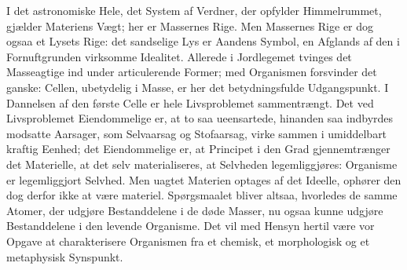 \documentclass[12pt,a4paper]{book}
\begin{document}
I det astronomiske Hele, det System af Verdner, der opfylder
Himmelrummet, gjælder Materiens Vægt; her er
Massernes Rige. Men Massernes Rige er dog ogsaa et Lysets Rige: det
sandselige Lys er Aandens Symbol, en Afglands af den i
Fornuftgrunden virksomme Idealitet. Allerede i Jordlegemet tvinges
det Masseagtige ind under articulerende Former; med Organismen
forsvinder det ganske: Cellen, ubetydelig i Masse, er her det
betydningsfulde Udgangspunkt. I Dannelsen af den første Celle er
hele Livsproblemet sammentrængt. Det ved Livsproblemet
Eiendommelige er, at to saa ueensartede, hinanden saa indbyrdes
modsatte Aarsager, som Selvaarsag og Stofaarsag, virke sammen i
umiddelbart kraftig Eenhed; det Eiendommelige er, at Principet i den
Grad gjennemtrænger det Materielle, at det selv materialiseres, at
Selvheden legemliggjøres: Organisme er legemliggjort Selvhed. Men
uagtet Materien optages af det Ideelle, ophører den dog derfor ikke
at være materiel. Spørgsmaalet bliver altsaa, hvorledes de samme
Atomer, der udgjøre Bestanddelene i de døde Masser, nu ogsaa kunne
udgjøre Bestanddelene i den levende Organisme. Det vil med Hensyn
hertil være vor Opgave at charakterisere Organismen fra et chemisk,
et morphologisk og et metaphysisk Synspunkt.
\end{document}
